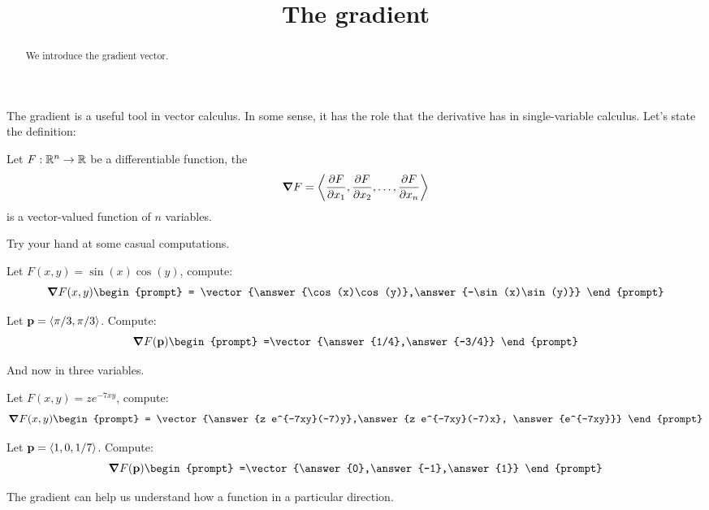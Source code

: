 \documentclass{ximera}
\title[Dig-In:]{The gradient}
\begin{document}
\begin{abstract}
We introduce the gradient vector. 
\end{abstract}
\maketitle

The gradient is a useful tool in vector calculus. In some sense, it
has the role that the derivative has in single-variable calculus.
Let's state the definition:

\begin{definition}
  Let $F:\R^n\to \R$ be a differentiable function, the 
  \[
  \grad F = \vector{\pp[F]{x_1},\pp[F]{x_2},\dots,\pp[F]{x_n}}
  \]
  is a vector-valued function of $n$ variables. 
\end{definition}

Try your hand at some casual computations.

\begin{question}
  Let $F(x,y) = \sin(x)\cos(y)$, compute:
  \[
  \grad F(x,y)
  \begin{prompt}
    = \vector{\answer{\cos(x)\cos(y)},\answer{-\sin(x)\sin(y)}}
  \end{prompt}
  \]
  \begin{question}
    Let $\vec{p}= \vector{\pi/3,\pi/3}$. Compute:
    \[
    \grad F(\vec{p})
    \begin{prompt}
      =\vector{\answer{1/4},\answer{-3/4}}
    \end{prompt}
    \]
  \end{question}
\end{question}

And now in three variables.

\begin{question}
  Let $F(x,y) = ze^{-7xy}$, compute:
  \[
  \grad F(x,y)
  \begin{prompt}
    = \vector{\answer{z e^{-7xy}(-7)y},\answer{z e^{-7xy}(-7)x}, \answer{e^{-7xy}}}
  \end{prompt}
  \]
  \begin{question}
    Let $\vec{p}= \vector{1,0,1/7}$. Compute:
    \[
    \grad F(\vec{p})
    \begin{prompt}
      =\vector{\answer{0},\answer{-1},\answer{1}}
    \end{prompt}
    \]
  \end{question}
\end{question}

The gradient can help us understand how a function in a particular
direction.
\end{document}
